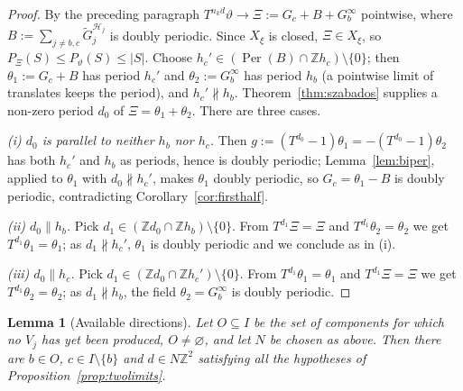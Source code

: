 \documentclass[11pt,reqno]{amsart}
\theoremstyle{plain}
\newtheorem{lem}[thm]{Lemma}
\theoremstyle{definition}
\theoremstyle{remark}
\theoremstyle{plain}
\theoremstyle{remark}
\theoremstyle{definition}
\numberwithin{equation}{section}
\DeclareMathOperator{\Per}{Per}
\newcommand{\Z}{\mathbb{Z}}
\newcommand{\cH}{\mathcal{H}}
\begin{document}
\begin{proof}
By the preceding paragraph $T^{n_kd}\vartheta\to\Xi:=G_c+B+G_b^\infty$
pointwise, where $B:=\sum_{j\ne b,c}\widetilde G_j^{\cH_j}$ is doubly periodic.
Since $X_\xi$ is closed, $\Xi\in X_\xi$, so $P_\Xi(S)\le P_\vartheta(S)\le|S|$.
Choose $h_c'\in(\Per(B)\cap\Z h_c)\setminus\{0\}$; then
$\theta_1:=G_c+B$ has period $h_c'$ and $\theta_2:=G_b^\infty$ has period $h_b$
(a pointwise limit of translates keeps the period), and $h_c'\nparallel h_b$.
Theorem~\ref{thm:szabados} supplies a non-zero period $d_0$ of
$\Xi=\theta_1+\theta_2$.  There are three cases.

\emph{(i) $d_0$ is parallel to neither $h_b$ nor $h_c$.}  Then
$g:=(T^{d_0}-1)\theta_1=-(T^{d_0}-1)\theta_2$ has both $h_c'$ and $h_b$ as
periods, hence is doubly periodic; Lemma~\ref{lem:biper}, applied to $\theta_1$
with $d_0\nparallel h_c'$, makes $\theta_1$ doubly periodic, so
$G_c=\theta_1-B$ is doubly periodic, contradicting
Corollary~\ref{cor:firsthalf}.

\emph{(ii) $d_0\parallel h_b$.}  Pick $d_1\in(\Z d_0\cap\Z h_b)\setminus\{0\}$.
From $T^{d_1}\Xi=\Xi$ and $T^{d_1}\theta_2=\theta_2$ we get
$T^{d_1}\theta_1=\theta_1$; as $d_1\nparallel h_c'$, $\theta_1$ is doubly
periodic and we conclude as in (i).

\emph{(iii) $d_0\parallel h_c$.}  Pick
$d_1\in(\Z d_0\cap\Z h_c')\setminus\{0\}$.  From $T^{d_1}\theta_1=\theta_1$ and
$T^{d_1}\Xi=\Xi$ we get $T^{d_1}\theta_2=\theta_2$; as $d_1\nparallel h_b$, the
field $\theta_2=G_b^\infty$ is doubly periodic.
\end{proof}

\begin{lem}[Available directions]\label{lem:available}
Let $O\subseteq I$ be the set of components for which no $V_j$ has yet been
produced, $O\ne\varnothing$, and let $N$ be chosen as above.  Then there are
$b\in O$, $c\in I\setminus\{b\}$ and $d\in N\Z^2$ satisfying all the hypotheses
of Proposition~\ref{prop:twolimits}.
\end{lem}
\end{document}
